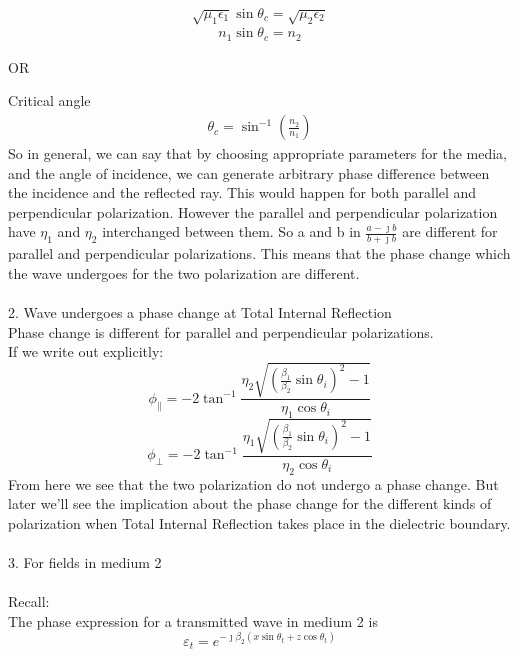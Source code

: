 \begin{equation*}
\sqrt{\mu_1\epsilon_1} \sin\theta_c = \sqrt{\mu_2\epsilon_2}
\end{equation*}
\begin{align*}
n_1 \sin\theta_c = n_2
\end{align*}
\begin{center}
	OR
\end{center}
Critical angle
\begin{align*}
\theta_c = \sin^{-1}(\frac{n_2}{n_1}) 
\end{align*}
So in general, we can say that by choosing appropriate parameters for the media, and the angle of incidence, we can generate arbitrary phase difference between the incidence and the reflected ray. This would happen for both parallel and perpendicular polarization. However the parallel and perpendicular polarization have $\eta_1$ and $\eta_2$
interchanged between them. So a and b in $\frac{a - \jmath b}{b + \jmath b}$ are different for parallel and perpendicular polarizations. This means that the phase change which the wave undergoes for the two polarization are different.\\ \\
2. Wave undergoes a phase change at Total Internal Reflection\\
Phase change is different for parallel and perpendicular polarizations.\\
If we write out explicitly:
\begin{equation}
\phi_\parallel = -2\tan^{-1}\frac{\eta_2\sqrt{(\frac{\beta_1}{\beta_2}\sin\theta_i)^2-1}}{\eta_1\cos\theta_i}
\end{equation}
\begin{equation}
\phi_\perp = -2\tan^{-1}\frac{\eta_1\sqrt{(\frac{\beta_1}{\beta_2}\sin\theta_i)^2-1}}{\eta_2\cos\theta_i}
\end{equation}
From here we see that the two polarization do not undergo a phase change. But later we'll see the implication about the phase change for the different kinds of polarization when Total Internal Reflection takes place in the dielectric boundary. \\ \\
3. For fields in medium 2\\ \\
Recall:\\
The phase expression for a transmitted wave in medium 2 is
\begin{equation*}
\varepsilon_t = e^{-\jmath \beta_2(x\sin\theta_t + z\cos\theta_t)}
\end{equation*}\\

